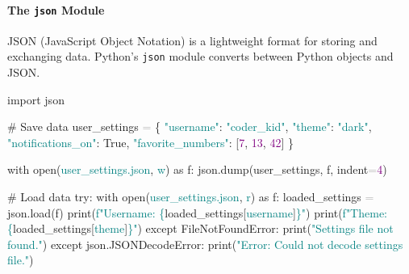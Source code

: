 \documentclass[
  justified,
  openright,
]{tufte-book}
\let\subsubsection\paragraph
\let\paragraph\paragraph
\newcommand{\BuiltInTok}[1]{#1}
\newcommand{\CommentTok}[1]{\textcolor{MidGray}{#1}}
\newcommand{\ControlFlowTok}[1]{\textcolor{BrandBlue}{#1}}
\newcommand{\DecValTok}[1]{\textcolor{Purple}{#1}}
\newcommand{\ImportTok}[1]{\textcolor{BrandAccent}{#1}}
\newcommand{\NormalTok}[1]{#1}
\newcommand{\OperatorTok}[1]{\textcolor{DarkGray}{#1}}
\newcommand{\PreprocessorTok}[1]{\textcolor{BrandAccent}{#1}}
\newcommand{\SpecialCharTok}[1]{\textcolor{Teal}{#1}}
\newcommand{\SpecialStringTok}[1]{\textcolor{Teal}{#1}}
\newcommand{\StringTok}[1]{\textcolor{Teal}{#1}}
\newcommand{\VariableTok}[1]{#1}
\newenvironment{Shaded}{%
  \begin{snugshade}
}{%
  \end{snugshade}
}
\let\subsubsection\paragraph
\let\paragraph\paragraph
\begin{document}
\subsubsection{\texorpdfstring{The \texttt{json}
Module}{The json Module}}\label{the-json-module}

JSON (JavaScript Object Notation) is a lightweight format for storing
and exchanging data. Python's \texttt{json} module converts between
Python objects and JSON.

\begin{Shaded}
\begin{Highlighting}[]
\ImportTok{import}\NormalTok{ json}

\CommentTok{\# Save data}
\NormalTok{user\_settings }\OperatorTok{=}\NormalTok{ \{}
    \StringTok{"username"}\NormalTok{: }\StringTok{"coder\_kid"}\NormalTok{,}
    \StringTok{"theme"}\NormalTok{: }\StringTok{"dark"}\NormalTok{,}
    \StringTok{"notifications\_on"}\NormalTok{: }\VariableTok{True}\NormalTok{,}
    \StringTok{"favorite\_numbers"}\NormalTok{: [}\DecValTok{7}\NormalTok{, }\DecValTok{13}\NormalTok{, }\DecValTok{42}\NormalTok{]}
\NormalTok{\}}

\ControlFlowTok{with} \BuiltInTok{open}\NormalTok{(}\StringTok{\textquotesingle{}user\_settings.json\textquotesingle{}}\NormalTok{, }\StringTok{\textquotesingle{}w\textquotesingle{}}\NormalTok{) }\ImportTok{as}\NormalTok{ f:}
\NormalTok{    json.dump(user\_settings, f, indent}\OperatorTok{=}\DecValTok{4}\NormalTok{)}

\CommentTok{\# Load data}
\ControlFlowTok{try}\NormalTok{:}
    \ControlFlowTok{with} \BuiltInTok{open}\NormalTok{(}\StringTok{\textquotesingle{}user\_settings.json\textquotesingle{}}\NormalTok{, }\StringTok{\textquotesingle{}r\textquotesingle{}}\NormalTok{) }\ImportTok{as}\NormalTok{ f:}
\NormalTok{        loaded\_settings }\OperatorTok{=}\NormalTok{ json.load(f)}
    \BuiltInTok{print}\NormalTok{(}\SpecialStringTok{f"Username: }\SpecialCharTok{\{}\NormalTok{loaded\_settings[}\StringTok{\textquotesingle{}username\textquotesingle{}}\NormalTok{]}\SpecialCharTok{\}}\SpecialStringTok{"}\NormalTok{)}
    \BuiltInTok{print}\NormalTok{(}\SpecialStringTok{f"Theme: }\SpecialCharTok{\{}\NormalTok{loaded\_settings[}\StringTok{\textquotesingle{}theme\textquotesingle{}}\NormalTok{]}\SpecialCharTok{\}}\SpecialStringTok{"}\NormalTok{)}
\ControlFlowTok{except} \PreprocessorTok{FileNotFoundError}\NormalTok{:}
    \BuiltInTok{print}\NormalTok{(}\StringTok{"Settings file not found."}\NormalTok{)}
\ControlFlowTok{except}\NormalTok{ json.JSONDecodeError:}
    \BuiltInTok{print}\NormalTok{(}\StringTok{"Error: Could not decode settings file."}\NormalTok{)}
\end{Highlighting}
\end{Shaded}
\end{document}
